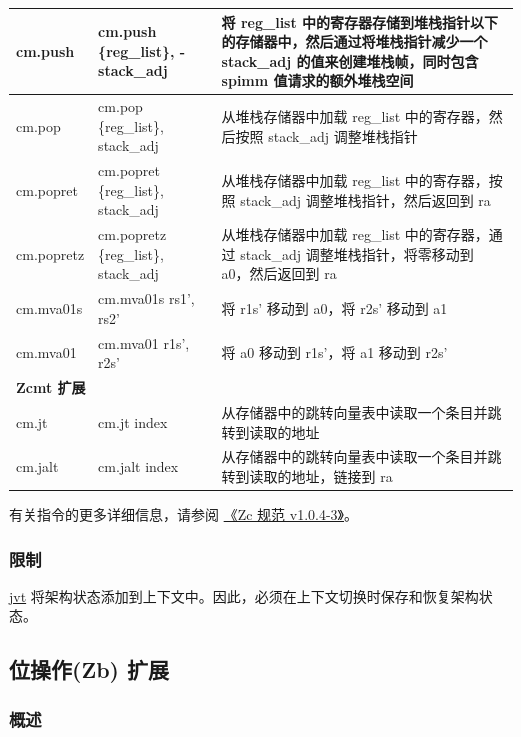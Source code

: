 \documentclass[main\_\_CN.tex]{subfiles}
\begin{document}
\begin{longtable}{ | p{2.0cm} | p{4.0cm} |  p{10.0cm} | }
cm.push & cm.push \{reg\_list\}, -stack\_adj & 将 reg\_list 中的寄存器存储到堆栈指针以下的存储器中，然后通过将堆栈指针减少一个 stack\_adj 的值来创建堆栈帧，同时包含 spimm 值请求的额外堆栈空间\\\hline
cm.pop & cm.pop \{reg\_list\}, stack\_adj & 从堆栈存储器中加载 reg\_list 中的寄存器，然后按照 stack\_adj 调整堆栈指针 \\\hline
cm.popret & cm.popret \{reg\_list\}, stack\_adj & 从堆栈存储器中加载 reg\_list 中的寄存器，按照 stack\_adj 调整堆栈指针，然后返回到 ra\\\hline
cm.popretz & cm.popretz \{reg\_list\}, stack\_adj & 从堆栈存储器中加载 reg\_list 中的寄存器，通过 stack\_adj 调整堆栈指针，将零移动到 a0，然后返回到 ra\\\hline
cm.mva01s & cm.mva01s rs1', rs2' &  将 r1s' 移动到 a0，将 r2s' 移动到 a1\\\hline
cm.mva01 & cm.mva01 r1s', r2s' & 将 a0 移动到 r1s'，将 a1 移动到 r2s' \\\hline

\multicolumn{3}{|l|}{\textbf{Zcmt 扩展}} \\\hline

cm.jt & cm.jt index & 从存储器中的跳转向量表中读取一个条目并跳转到读取的地址 \\\hline
cm.jalt & cm.jalt index & 从存储器中的跳转向量表中读取一个条目并跳转到读取的地址，链接到 ra  \\\hline

\end{longtable}

有关指令的更多详细信息，请参阅 \href{https://github.com/riscvarchive/riscv-code-size-reduction/blob/v1.0.4-3/Zc-specification/Zc.adoc}{《Zc 规范 v1.0.4-3》}。

\subsubsection{限制}
\label{sec:riscvcpu-zc-limit-descr}

\hyperref[regdesc:JVT]{jvt} 将架构状态添加到上下文中。因此，必须在上下文切换时保存和恢复架构状态。


\newpage
\subsection{位操作(Zb) 扩展}
\label{sec:riscvcpu-zb}

\subsubsection{概述}
\label{sec:riscvcpu-zb-overview}
\end{document}
